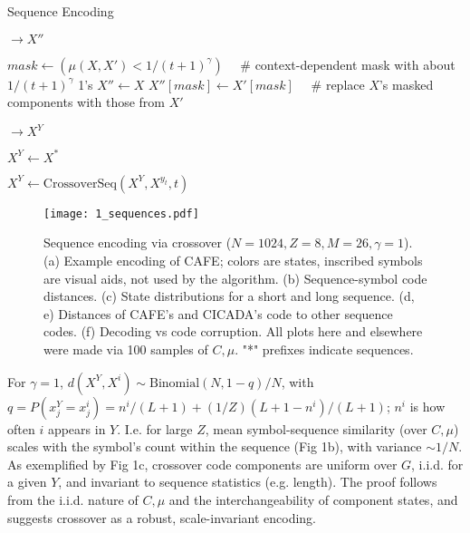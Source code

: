 \documentclass{article}
\begin{document}
\begin{algorithm}
\caption{Sequence Encoding}
\label{alg:1}

\begin{algorithmic}[0]
 $\rightarrow X''$

\State $mask \gets (\mu(X, X') < 1/(t+1)^\gamma) \quad$  \# context-dependent mask with about $1/(t+1)^\gamma$ 1's
\State $X'' \gets X$
\State $X''[mask] \gets X'[mask] \quad$  \# replace $X$'s masked components with those from $X'$

\EndFunction

\State 

 $\rightarrow X^Y$

\State $X^Y \gets X^*$

\State $X^Y \gets \textrm{CrossoverSeq}(X^Y, X^{y_t}, t)$

\EndFor

\EndFunction

\end{algorithmic}
\end{algorithm}

\begin{figure}
  \centering
  \texttt{[image: 1\_sequences.pdf]}
  \caption{Sequence encoding via crossover ($N=1024, Z=8, M=26, \gamma=1$). (a) Example encoding of CAFE; colors are states, inscribed symbols are visual aids, not used by the algorithm. (b) Sequence-symbol code distances. (c) State distributions for a short and long sequence. (d, e) Distances of CAFE's and CICADA's code to other sequence codes. (f) Decoding vs code corruption. All plots here and elsewhere were made via 100 samples of $C, \mu$. "*" prefixes indicate sequences.}
  \label{fig:1}
\end{figure}

For $\gamma = 1$, $d(X^Y, X^i) \sim \textrm{Binomial}(N, 1-q)/N$, with $q = P(x^Y_j = x^i_j) = n^i/(L+1) + (1/Z)(L+1-n^i)/(L+1)$; $n^i$ is how often $i$ appears in $Y$. I.e. for large $Z$, mean symbol-sequence similarity (over $C, \mu$) scales with the symbol's count within the sequence (Fig 1b), with variance $\sim 1/N$. As exemplified by Fig 1c, crossover code components are uniform over $G$, i.i.d. for a given $Y$, and invariant to sequence statistics (e.g. length). The proof follows from the i.i.d. nature of $C, \mu$ and the interchangeability of component states, and suggests crossover as a robust, scale-invariant encoding.
\end{document}
